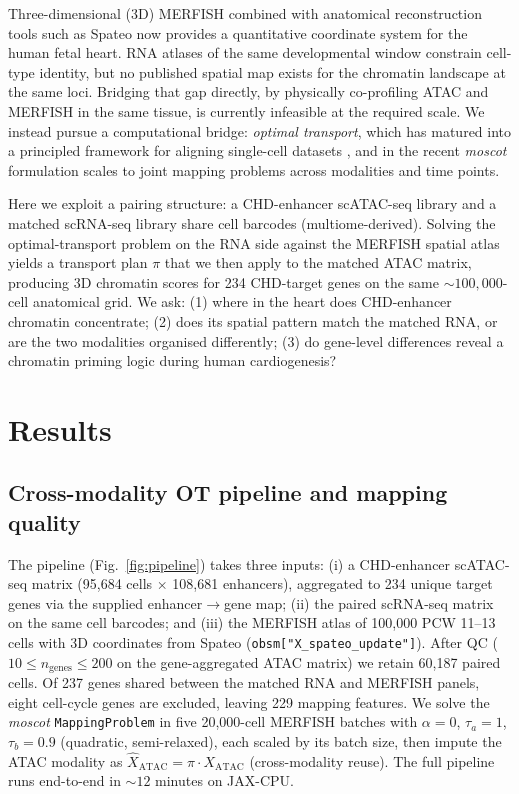 \documentclass[11pt,a4paper]{article}
\begin{document}
Three-dimensional (3D) MERFISH \citep{chen2015merfish,moffitt2016merfish}
combined with anatomical reconstruction tools such as Spateo
\citep{qiu2024spateo} now provides a quantitative coordinate system for the
human fetal heart. RNA atlases of the same developmental window
\citep{asp2019heart,cui2019fetalheart,sahara2019cardiogenesis,litvinukova2020adultheart}
constrain cell-type identity, but no published spatial map exists for the
chromatin landscape at the same loci. Bridging that gap directly, by physically
co-profiling ATAC and MERFISH in the same tissue, is currently infeasible at
the required scale. We instead pursue a computational bridge: \emph{optimal
transport}, which has matured into a principled framework for aligning
single-cell datasets \citep{schiebinger2019waddingtonot,demetci2022scot},
and in the recent \emph{moscot} formulation \citep{klein2025moscot} scales to
joint mapping problems across modalities and time points.

Here we exploit a pairing structure: a CHD-enhancer scATAC-seq library and a
matched scRNA-seq library share cell barcodes (multiome-derived). Solving the
optimal-transport problem on the RNA side against the MERFISH spatial atlas
yields a transport plan \(\pi\) that we then apply to the matched ATAC matrix,
producing 3D chromatin scores for 234 CHD-target genes on the same
\(\sim\!100{,}000\)-cell anatomical grid. We ask: (1) where in the heart
does CHD-enhancer chromatin concentrate; (2) does its spatial pattern match
the matched RNA, or are the two modalities organised differently;
(3) do gene-level differences reveal a chromatin priming logic
\citep{wamstad2012priming,paige2012priming} during human cardiogenesis?

\section{Results}

\subsection{Cross-modality OT pipeline and mapping quality}

The pipeline (Fig.~\ref{fig:pipeline}) takes three inputs: (i) a CHD-enhancer
scATAC-seq matrix (95{,}684 cells \(\times\) 108{,}681 enhancers), aggregated
to 234 unique target genes via the supplied enhancer\(\rightarrow\)gene map;
(ii) the paired scRNA-seq matrix on the same cell barcodes; and (iii) the
MERFISH atlas of 100{,}000 PCW 11--13 cells with 3D coordinates from Spateo
(\texttt{obsm["X\_spateo\_update"]}). After QC
(\(10\!\le\!n_\text{genes}\!\le\!200\) on the gene-aggregated ATAC matrix) we
retain 60{,}187 paired cells. Of 237 genes shared between the matched RNA and
MERFISH panels, eight cell-cycle genes are excluded, leaving 229 mapping
features. We solve the \emph{moscot} \texttt{MappingProblem} in five
20{,}000-cell MERFISH batches with \(\alpha=0\), \(\tau_a=1\), \(\tau_b=0.9\)
(quadratic, semi-relaxed), each scaled by its batch size, then impute the ATAC
modality as \(\hat{X}_\text{ATAC} = \pi \cdot X_\text{ATAC}\) (cross-modality
reuse). The full pipeline runs end-to-end in \(\sim\!12\) minutes on JAX-CPU.
\end{document}
